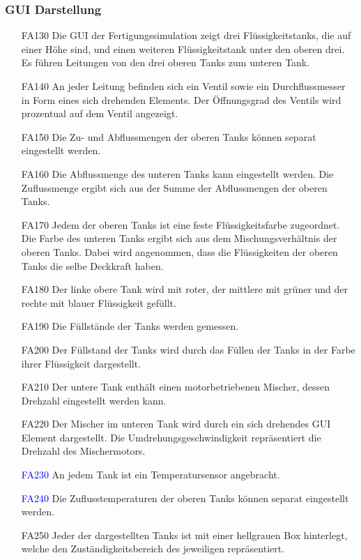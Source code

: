 \documentclass[parskip=full]{scrartcl}
\begin{document}
\subsubsection{GUI Darstellung}
\begin{enumerate}
  \item[FA130] Die \gls{GUI} der \gls{Fertigungssimulation} zeigt drei Flüssigkeitstanks, die auf einer Höhe sind, und einen weiteren Flüssigkeitstank unter den oberen drei.
    Es führen Leitungen von den drei oberen Tanks zum unteren Tank.
  \item[FA140] An jeder Leitung befinden sich ein Ventil sowie ein Durchflussmesser in Form eines sich drehenden Elements. Der Öffnungsgrad des Ventils wird prozentual auf dem Ventil angezeigt.
  \item[FA150] Die Zu- und Abflussmengen der oberen Tanks können separat eingestellt werden.
  \item[FA160] Die Abflussmenge des unteren Tanks kann eingestellt werden. Die Zuflussmenge ergibt sich aus der Summe der Abflussmengen der oberen Tanks.
  \item[FA170] Jedem der oberen Tanks ist eine feste Flüssigkeitsfarbe zugeordnet. Die Farbe des unteren Tanks ergibt sich aus dem Mischungsverhältnis der oberen Tanks. Dabei wird
	angenommen, dass die Flüssigkeiten der oberen Tanks die selbe Deckkraft haben.
  \item[FA180] Der linke obere Tank wird mit roter, der mittlere mit grüner und der rechte mit blauer Flüssigkeit gefüllt.
  \item[FA190] Die Füllstände der Tanks werden gemessen.
  \item[FA200] Der Füllstand der Tanks wird durch das Füllen der Tanks in der Farbe ihrer Flüssigkeit dargestellt.
  \item[FA210] Der untere Tank enthält einen motorbetriebenen Mischer, dessen Drehzahl eingestellt werden kann.
  \item[FA220] Der Mischer im unteren Tank wird durch ein sich drehendes \gls{GUI} Element dargestellt.
    Die Umdrehungsgeschwindigkeit repräsentiert die Drehzahl des Mischermotors.
  \item[\textcolor{blue}{FA230}] An jedem Tank ist ein Temperatursensor angebracht.
  \item[\textcolor{blue}{FA240}] Die Zuflusstemperaturen der oberen Tanks können separat eingestellt werden.
  \item[FA250] Jeder der dargestellten Tanks ist mit einer hellgrauen Box hinterlegt, welche den Zuständigkeitsbereich des jeweiligen  repräsentiert.

\end{enumerate}
\end{document}
